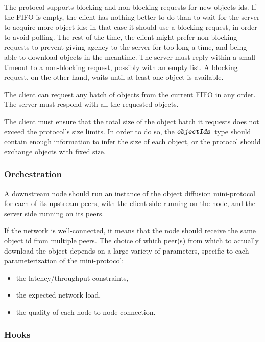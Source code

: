 The protocol supports blocking and non-blocking requests for new objects ids. If
the FIFO is empty, the client has nothing better to do than to wait for the
server to acquire more object ids; in that case it should use a blocking
request, in order to avoid polling. The rest of the time, the client might
prefer non-blocking requests to prevent giving agency to the server for too long
a time, and being able to download objects in the meantime. The server must
reply within a small timeout to a non-blocking request, possibly with an empty
list. A blocking request, on the other hand, waits until at least one object is
available.

The client can request any batch of objects from the current FIFO in any order.
The server must respond with all the requested objects.%
%
%

The client must ensure that the total size of the object batch it requests does not
exceed the protocol's size limits. In order to do so, the $\textbf{\texttt{\textit{objectIds}}}$ type
should contain enough information to infer the size of each object, or the protocol
should exchange objects with fixed size.

\subsubsection{Orchestration}

A downstream node should run an instance of the object diffusion mini-protocol
for each of its upstream peers, with the client side running on the node, and
the server side running on its peers.

If the network is well-connected, it means that the node should receive the same object id
from multiple peers. The choice of which peer(s) from which to actually download the object
depends on a large variety of parameters, specific to each parameterization of the mini-protocol:
\begin{itemize}
  \item the latency/throughput constraints,
  \item the expected network load,
  \item the quality of each node-to-node connection.
\end{itemize}

\subsubsection{Hooks}


